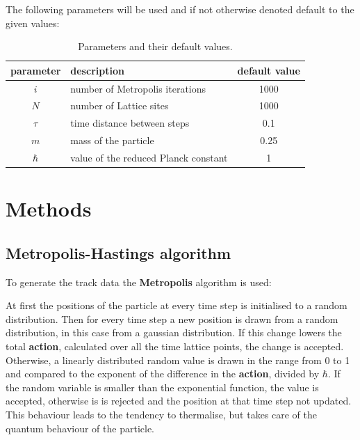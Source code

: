 \documentclass{scrartcl}
\begin{document}
		The following parameters will be used and if not otherwise denoted default to the given values:
		\begin{table}
			\centering
			\begin{tabular}{c|l|c}
				parameter & description & default value\\
				\hline
				$i$ & number of Metropolis iterations & 1000\\
				$N$ & number of Lattice sites & 1000\\
				$\tau$ & time distance between steps & 0.1\\
				$m$ & mass of the particle & 0.25\\
				$\hbar$ & value of the reduced Planck constant & 1\\
			\end{tabular}
			\caption{Parameters and their default values.}
			\label{eq:parameters}
		\end{table}
	\section{Methods}

	\subsection{Metropolis-Hastings algorithm}
		To generate the track data the \textbf{Metropolis} algorithm is used:

		At first the positions of the particle at every time step is initialised to a random distribution.
		Then for every time step a new position is drawn from a random distribution, in this case from a gaussian distribution.
		If this change lowers the total \textbf{action}, calculated over all the time lattice points, the change is accepted.
		Otherwise, a linearly distributed random value is drawn in the range from 0 to 1 and compared to the exponent of the difference in the \textbf{action}, divided by $\hbar$.
		If the random variable is smaller than the exponential function, the value is accepted, otherwise is is rejected and the position at that time step not updated.
		This behaviour leads to the tendency to thermalise, but takes care of the quantum behaviour of the particle.
\end{document}
